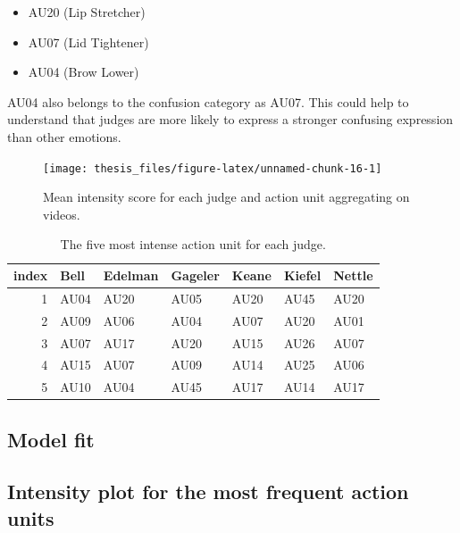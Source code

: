\documentclass{monashthesis}
\begin{document}
\begin{itemize}
\tightlist
\item
  AU20 (Lip Stretcher)
\item
  AU07 (Lid Tightener)
\item
  AU04 (Brow Lower)
\end{itemize}

AU04 also belongs to the confusion category as AU07. This could help to understand that judges are more likely to express a stronger confusing expression than other emotions.

\begin{figure}
\texttt{[image: thesis\_files/figure-latex/unnamed-chunk-16-1]} \caption{Mean intensity score for each judge and action unit aggregating on videos.\label{fig:mean_intensity}}\label{fig:unnamed-chunk-16}
\end{figure}

\begin{table}[t]

\caption{\label{tab:unnamed-chunk-17}\label{tab:most_intense}The five most intense action unit for each judge.}
\centering
\begin{tabular}{r|l|l|l|l|l|l}
\hline
index & Bell & Edelman & Gageler & Keane & Kiefel & Nettle\\
\hline
1 & AU04 & AU20 & AU05 & AU20 & AU45 & AU20\\
\hline
2 & AU09 & AU06 & AU04 & AU07 & AU20 & AU01\\
\hline
3 & AU07 & AU17 & AU20 & AU15 & AU26 & AU07\\
\hline
4 & AU15 & AU07 & AU09 & AU14 & AU25 & AU06\\
\hline
5 & AU10 & AU04 & AU45 & AU17 & AU14 & AU17\\
\hline
\end{tabular}
\end{table}

\hypertarget{model-fit}{%
\subsection{Model fit}\label{model-fit}}

\hypertarget{intensity-plot-for-the-most-frequent-action-units}{%
\subsection{Intensity plot for the most frequent action units}\label{intensity-plot-for-the-most-frequent-action-units}}
\end{document}
